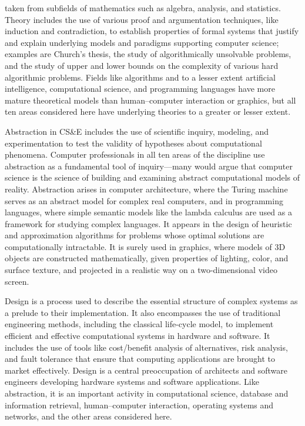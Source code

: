 taken from subfields of mathematics such as algebra, analysis,
and statistics. Theory includes the use of various proof and
argumentation techniques, like induction and contradiction, to
establish properties of formal systems that justify and explain
underlying models and paradigms supporting computer science;
examples are Church's thesis, the study of algorithmically
unsolvable problems, and the study of upper and lower bounds on
the complexity of various hard algorithmic problems. Fields like
algorithms and to a lesser extent artificial intelligence,
computational science, and programming languages have more
mature theoretical models than human--computer interaction or
graphics, but all ten areas considered here have underlying
theories to a greater or lesser extent.

Abstraction in CS\&E includes the use of scientific inquiry,
modeling, and experimentation to test the validity of hypotheses
about computational phenomena. Computer professionals in all ten
areas of the discipline use abstraction as a fundamental tool of
inquiry---many would argue that computer science is the science
of building and examining abstract computational models of
reality. Abstraction arises in computer architecture, where the
Turing machine serves as an abstract model for complex real
computers, and in programming languages, where simple semantic
models like the lambda calculus are used as a framework for
studying complex languages. It appears in the design of heuristic
and approximation algorithms for problems whose optimal
solutions are computationally intractable. It is surely used in
graphics, where models of 3D objects are constructed
mathematically, given properties of lighting, color, and surface
texture, and projected in a realistic way on a two-dimensional
video screen.


Design is a process used to describe the essential structure of
complex systems as a prelude to their implementation. It also
encompasses the use of traditional engineering methods,
including the classical life-cycle model, to implement efficient
and effective computational systems in hardware and software. It
includes the use of tools like cost/benefit analysis of
alternatives, risk analysis, and fault tolerance that ensure
that computing applications are brought to market effectively.
Design is a central preoccupation of architects and software
engineers developing hardware systems and software applications.
Like abstraction, it is an important activity in computational
science, database and information retrieval, human--computer
interaction, operating systems and networks, and the other areas
considered here.

